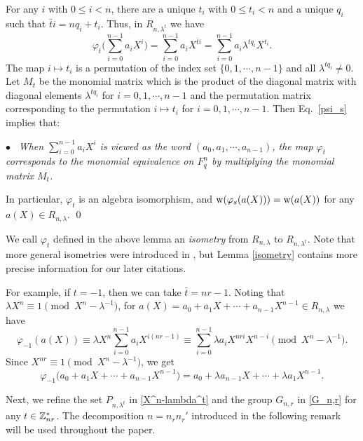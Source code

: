 \documentclass{article}
\numberwithin{equation}{section}
\numberwithin{table}{section}
\def\Z{{\Bbb Z}}
\def\M{{\varphi}} \def\N{{\psi}} \def\m{{\mu}}
\begin{document}
For any $i$ with $0\le i<n$,
there are a unique $t_{i}$ with $0\le t_i<n$
and a unique $q_i$ such that $\bar t i=nq_i+t_i$.
Thus, in $R_{n,\lambda^t}$ we have
\begin{equation}\label{psi_s}
\M_t\Big(\sum_{i=0}^{n-1}a_iX^i\Big)=\sum_{i=0}^{n-1}a_iX^{\bar t i}
=\sum_{i=0}^{n-1}a_i\lambda^{t q_i}X^{t_i}.
\end{equation}
The map $i\mapsto t_i$ is a permutation of the index set $\{0,1,\cdots,n-1\}$
and all ${\lambda^{t q_i}\ne 0}$.
Let $M_t$ be the monomial matrix which is the product of the diagonal matrix
with diagonal elements $\lambda^{t q_i}$ for $i=0,1,\cdots,n-1$ and
the permutation matrix corresponding to the permutation
$i\mapsto t_i$ for $i=0,1,\cdots,n-1$. Then Eq.~\eqref{psi_s} implies that:

$\bullet$~
{\em When $\sum_{i=0}^{n-1}a_iX^i$ is viewed as the word
$(a_0,a_1,\cdots,a_{n-1})$,  the map $\M_t$ corresponds
to the monomial equivalence on $F_q^n$ by multiplying 
the monomial matrix $M_t$.}

\noindent
In particular, $\M_t$ is an algebra isomorphism, 
and ${\rm w}(\M_s(a(X)))={\rm w}(a(X))$
for any $a(X)\in R_{n,\lambda}$.
\qed

\medskip
We call $\M_t$ defined in the above lemma 
an {\em isometry} from $R_{n,\lambda}$ to $R_{n,\lambda^{t}}$.
Note that more general isometries were introduced in \cite{CFLL}, but
Lemma \ref{isometry} contains more precise information for our later citations.

For example, if $t=-1$, then we can take $\bar t=nr-1$.
Noting that $\lambda X^{n}\equiv 1\!\pmod{X^n-\lambda^{-1}}$,
for $a(X)=a_0+a_1X+\cdots+a_{n-1}X^{n-1}
\in R_{n,\lambda}$ we have
$$
\M_{-1}(a(X))\equiv\lambda X^{n}\sum_{i=0}^{n-1}a_iX^{i(nr-1)}
\equiv\sum_{i=0}^{n-1}\lambda a_iX^{nri}X^{n-i}\pmod{X^n-\lambda^{-1}}.
$$
Since $X^{nr}\equiv 1\!\pmod{X^n-\lambda^{-1}}$, we get 
\begin{equation}\label{M -1}
\M_{-1}\big( a_0+a_{1}X+\cdots+a_{n-1}X^{n-1}\big)
 = a_0+\lambda a_{n-1}X+\cdots+\lambda a_1X^{n-1}.
\end{equation}

\smallskip Next, we refine the set $P_{n,\lambda^t}$ in \eqref{X^n-lambda^t}
and the group $G_{n,r}$ in \eqref{G_n,r} for any $t\in\Z_{nr}^*$.
The decomposition $n=n_rn_r'$ introduced in the following remark 
will be used throughout the paper.
\end{document}
